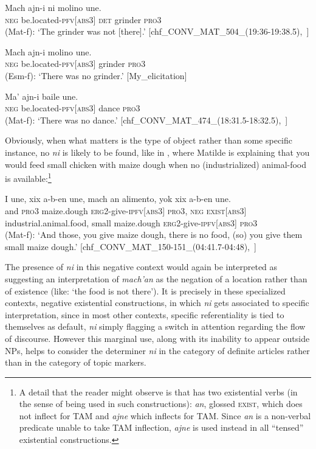 \documentclass[output=paper
,modfonts
,nonflat]{langsci/langscibook}
\begin{document}
\ea \label{ex:pico:57}

\ea \label{ex:pico:57a}
\gll Mach ajn-i ni molino une. \\
\textsc{neg} be.located-{\textsc{pfv[abs3]}} \textsc{det} grinder {\textsc{pro3}}\\
\glt (Mat-f): `The grinder was not [there].' [chf\_CONV\_MAT\_504\_(19:36-19:38.5),~\citealt{Delgado-Galvan2018archive}]

\ex \label{ex:pico:57b}
\gll Mach ajn-i molino une.\\
\textsc{neg} be.located-{\textsc{pfv[abs3]}} grinder {\textsc{pro3}}\\
\glt (Esm-f): `There was no grinder.' [My\_elicitation]

\ex \label{ex:pico:57c}
\gll Ma' ajn-i baile une.
\\
\textsc{neg} be.located-{\textsc{pfv[abs3]}} dance {\textsc{pro3}}\\
\glt (Mat-f): `There was no dance.' [chf\_CONV\_MAT\_474\_(18:31.5-18:32.5),~\citealt{Delgado-Galvan2018archive}]
\z
\z

Obviously, when what matters is the type of object rather than some specific instance, no \textit{ni} is likely to be found, like in , where Matilde is explaining that you would feed small chicken with maize dough when no (industrialized) animal-food is available:\footnote{A detail that the reader might observe is that  has two existential verbs (in the sense of being used in such constructions): \textit{an}, glossed \textsc{exist}, which does not inflect for TAM and \textit{ajne} which inflects for TAM. Since \textit{an} is a non-verbal predicate unable to take TAM inflection, \textit{ajne} is used instead in all ``tensed'' existential constructions.}

\ea \label{ex:pico:58}

\gll I une, xix a-b-en une, mach an alimento, yok xix a-b-en une.\\
and \textsc{pro3} maize.dough  \textsc{erg2}-give-\textsc{ipfv[abs3]} \textsc{pro3}, \textsc{neg} \textsc{exist[abs3]} industrial.animal.food, small maize.dough \textsc{erg2}-give-\textsc{ipfv[abs3]} \textsc{pro3} \\
\glt (Mat-f): `And those, you give maize dough, there is no food, (so) you give them small maize dough.' [chf\_CONV\_MAT\_150-151\_(04:41.7-04:48),~\citealt{Delgado-Galvan2018archive}]
\z

The presence of \textit{ni} in this negative context would again be interpreted as suggesting an interpretation of \textit{mach'an} as the negation of a location rather than of existence (like: `the food is not there'). It is precisely in these specialized contexts, negative existential constructions, in which \textit{ni} gets associated to specific  interpretation, since in most other contexts, specific referentiality is tied to  themselves as default, \textit{ni} simply flagging a switch in attention regarding the flow of discourse. However this marginal use, along with its inability to appear outside NPs, helps to consider the determiner \textit{ni} in the category of definite articles rather than in the category of topic markers.
\end{document}
